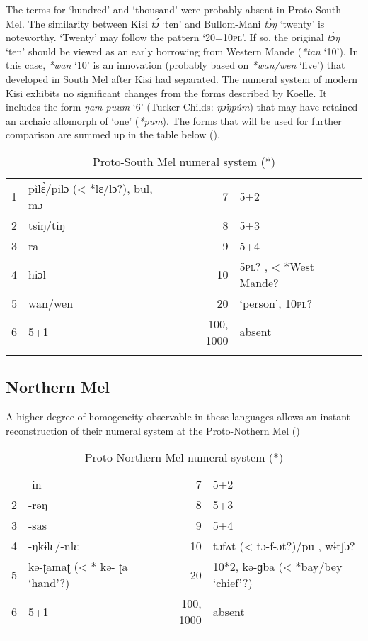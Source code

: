 The terms for ‘hundred’ and ‘thousand’ were probably absent in Proto-South-Mel. The similarity between Kisi \textit{t{\'{ɔ}}} ‘ten’ and Bullom-Mani \textit{t{\`{ɔ}}ŋ} ‘twenty’ is noteworthy. ‘Twenty’ may follow the pattern ‘20=10\textsc{pl}’. If so, the original \textit{t{\`{ɔ}}ŋ} ‘ten’ should be viewed as an early borrowing from Western Mande (\textit{*tan} ‘10’). In this case, \textit{*wan} ‘10’ is an innovation (probably based on \textit{*wan/wen} ‘five’) that developed in South Mel after Kisi had separated.  The numeral system of modern Kisi exhibits no significant changes from the forms described by Koelle. It includes the form \textit{ŋam-puum} ‘6’ (Tucker Childs: \textit{ŋ{\v{ɔ}}ŋpúm}) that may have retained an archaic allomorph of ‘one’ (\textit{*pum}). The forms that will be used for further comparison are summed up in the table below ().

\begin{table}
\caption{\label{tab:3:217}Proto-South Mel numeral system (*)}


\begin{tabularx}{\textwidth}{lQrl}
\lsptoprule

1 & pìl{\`{ɛ}}/pilɔ (< *lɛ/lɔ?), bul, mɔ & 7 & 5+2\\
2 & tsiŋ/tiŋ & 8 & 5+3\\
3 & ra & 9 & 5+4\\
4 & hiɔl & 10 & 5\textsc{pl}? , < *West Mande? \\
5 & wan/wen & 20 & ‘person’, 10\textsc{pl}? \\
6 & 5+1 &  {100,} 1000 & absent\\
\lspbottomrule
\end{tabularx}
\end{table}
  
 \largerpage
\subsection{Northern Mel}%

A higher degree of homogeneity observable in these languages allows an instant reconstruction of their numeral system at the Proto-Nothern Mel ()
\begin{table}
\caption{\label{tab:3:218}Proto-Northern Mel numeral system (*)}
\begin{tabularx}{\textwidth}{ll@{}rl}
\lsptoprule
1 & -in & 7 & 5+2\\
2 & -rəŋ & 8 & 5+3\\
3 & -sas & 9 & 5+4\\
4 & -ŋkɨlɛ/-nlɛ & 10 & tɔfʌt (< tɔ-f-ɔt?)/pu , wɨtʃɔ? \\
5 & kə-ʈamaʈ (< * kə- ʈa ‘hand’?) & 20 & 10*2, kə-ɡba (< *bay/bey ‘chief’?)\\
6 & 5+1 & 100, 1000 & absent\\
\lspbottomrule
\end{tabularx}
\end{table}


